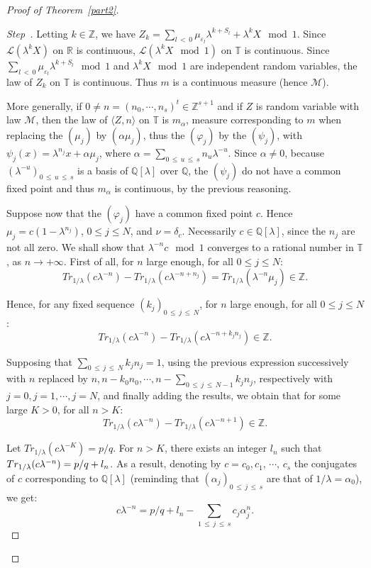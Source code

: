 \documentclass[10pt]{amsart}
\theoremstyle{definition}\newtheorem{defi}[theo]{Definition}\newtheorem{rema}[theo]{Remark}\newtheorem{exam}[theo]{Example}\newtheorem{exem}[theo]{Example}\newtheorem{nota}[theo]{Notation}
\newcommand{\Tbb}{\mathbb T}
\newcommand{\Rbb}{\mathbb R}
\newcommand{\Qbb}{\mathbb Q}
\newcommand{\Zbb}{\mathbb Z}
\newcommand{\Lcl}{\mathcal{L}}
\newcommand{\Mcl}{\mathcal{M}}
\newcounter{stepcount}
\newenvironment{step}{\refstepcounter{stepcount}\begin{proof}[Step~\thestepcount]}{\let\qed\relax\end{proof}}
\begin{document}
\begin{proof}[{Proof of Theorem~\ref{part2}}]
\begin{step}
Letting $k\in\Zbb$, we have $Z_k=\sum_{l\,<\,0}\mu_{\varepsilon_l}\lambda^{k+S_l}+\lambda^{k}X\mod 1$. Since ${\Lcl}(\lambda^kX)$ on $\Rbb$ is continuous, ${\Lcl}(\lambda^kX\mod 1)$ on $\Tbb$ is continuous. Since $\sum_{l\,<\,0}\mu_{\varepsilon_l}\lambda^{k+S_l}\mod1$ and $\lambda^{k}X\mod 1$ are independent random variables, the law of $Z_k$ on $\Tbb$ is continuous. Thus $m$ is a continuous measure (hence $\Mcl$).

More generally, if $0\not=n=(n_0,\cdots,n_s)^t\in\Zbb^{s+1}$ and if $Z$ is random variable with law $\Mcl$, then the law of $\langle Z,n\rangle$ on $\Tbb$ is $m_{\alpha}$, measure corresponding to $m$ when replacing the $(\mu_j)$ by $(\alpha\mu_j)$, thus the $(\varphi_j)$ by the $(\psi_j)$, with $\psi_j(x)=\lambda^{n_j}x+\alpha\mu_j$, where $\alpha=\sum_{0\,\leq\,u\,\leq\,s}n_u\lambda^{-u}$. Since $\alpha\not=0$, because $(\lambda^{-u})_{0\,\leq\,u\,\leq\,s}$ is a basis of $\Qbb[\lambda]$ over $\Qbb$, the $(\psi_j)$ do not have a common fixed point and thus $m_{\alpha}$ is continuous, by the previous reasoning.

Suppose now that the $(\varphi_j)$ have a common fixed point $c$. Hence $\mu_j=c(1-\lambda^{n_j})$, $0\leq j\leq N$, and $\nu=\delta_c$. Necessarily $c\in\Qbb[\lambda]$, since the $n_j$ are not all zero. We shall show that $\lambda^{-n}c\mod 1$ converges to a rational number in $\Tbb$, as $n\rightarrow+\infty$. First of all, for $n$ large enough, for all $0\leq j\leq N$:
\[
Tr_{1/\lambda}\left(c\lambda^{-n}\right)-Tr_{1/\lambda}\left(c\lambda^{-n+n_j}\right)=Tr_{1/\lambda}\left(\lambda^{-n}\mu_j\right)\in\Zbb.
\]

Hence, for any fixed sequence $(k_j)_{0\,\leq\,j\,\leq\,N}$, for $n$ large enough, for all $0\leq j\leq N$:
\[
Tr_{1/\lambda}\left(c\lambda^{-n}\right)-Tr_{1/\lambda}\left(c\lambda^{-n+k_jn_j}\right)\in\Zbb.
\]

Supposing that $\sum_{0\,\leq\,j\,\leq\,N}k_jn_j=1$, using the previous expression successively with $n$ replaced by $n,n-k_0n_0,\cdots,n-\sum_{0\,\leq\,j\,\leq\,N-1}k_jn_j$, respectively with $j=0,j=1,\cdots,j=N$, and finally adding the results, we obtain that for some large $K>0$, for all $n>K$:
\[
Tr_{1/\lambda}\left(c\lambda^{-n}\right)-Tr_{1/\lambda}\left(c\lambda^{-n+1}\right)\in\Zbb.
\]

Let $Tr_{1/\lambda}(c\lambda^{-K})=p/q$. For $n>K$, there exists an integer $l_n$ such that $Tr_{1/\lambda}(c\lambda^{-n})\linebreak=p/q+l_n$. As a result, denoting by $c=c_0,c_1,\,\cdots,\,c_s$ the conjugates of $c$ corresponding to $\Qbb[\lambda]$ (reminding that $(\alpha_j)_{0\,\leq\,j\,\leq\,s}$ are that of $1/\lambda=\alpha_0$), we get:
\[
c\lambda^{-n}=p/q+l_n-\sum_{1\,\leq\,j\,\leq\,s}c_j\alpha_j^n.
\]


\end{step}
\end{proof}
\end{document}
